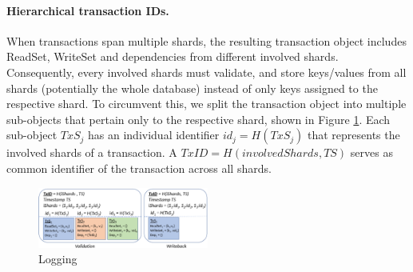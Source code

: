 \paragraph{Hierarchical transaction IDs.}
When transactions span multiple shards, the resulting transaction object includes ReadSet, WriteSet and dependencies from different involved shards. Consequently, every involved shards must validate, and store keys/values from all shards (potentially the whole database) instead of only keys assigned to the respective shard. To circumvent this, we split the transaction object into multiple sub-objects that pertain only to the respective shard, shown in Figure \ref{fig:FigureTxId}. Each sub-object $TxS_j$ has an individual identifier $id_j = H(TxS_j)$ that represents the involved shards of a transaction. A $TxID = H(involvedShards, TS)$ serves as common identifier of the transaction across all shards.

\begin{figure}
\begin{center}
\includegraphics[width= 0.5\textwidth]{./figures/TxIDs.png}
\end{center}
\caption{Logging}
\label{fig:FigureTxId}
\end{figure}

